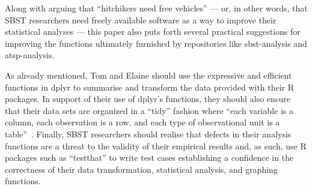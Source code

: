 



Along with arguing that ``hitchikers need free vehicles'' --- or, in other words, that SBST researchers need freely
available software as a way to improve their statistical analyses --- this paper also puts forth several practical
suggestions for improving the functions ultimately furnished by repositories like sbst-analysis and atsp-analysis.


As already mentioned, Tom and Elaine should use the expressive and efficient functions in dplyr to summarise and
transform the data provided with their R packages. In support of their use of dplyr's functions, they should also ensure
that their data sets are organized in a ``tidy'' fashion where ``each variable is a column, each observation is a row,
and each type of observational unit is a table''~\cite{Wickham2014}.  Finally, SBST researchers should realise that defects in
their analysis functions are a threat to the validity of their empirical results and, as such, use R packages such as
``testthat'' to write test cases establishing a confidence in the correctness of their data transformation, statistical
analysis, and graphing functions.


